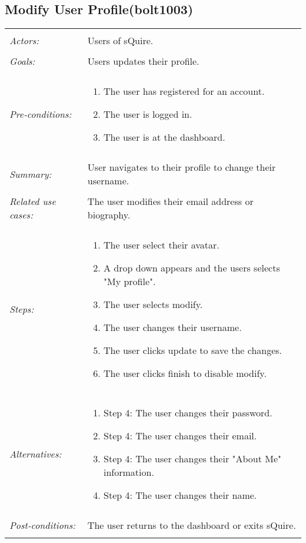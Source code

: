 \documentclass[11pt]{report}
\begin{document}
\subsection{Modify User Profile(bolt1003)}
\begin{tabular}{ p{2cm} p{12cm} }
 \hline
 \\
 \textit{Actors:} & Users of sQuire. \\ 
 \\
 \textit{Goals:} & Users updates their profile. \\
 \\
 \textit{Pre-conditions:} & \begin{enumerate}
  \item The user has registered for an account.
  \item The user is logged in.
  \item The user is at the dashboard.
 \end{enumerate} \\
 \\
 \textit{Summary:} & User navigates to their profile to change their username.\\ 
 \\
 \textit{Related use cases:} & The user modifies their email address or biography. \\ 
 \\
 \textit{Steps:} & \begin{enumerate}
  \item The user select their avatar.
  \item A drop down appears and the users selects "My profile".
  \item The user selects modify. 
  \item The user changes their username.
  \item The user clicks update to save the changes.
  \item The user clicks finish to disable modify.
 \end{enumerate} \\
 \\
 \textit{Alternatives:} & \begin{enumerate} 
  \item Step 4: The user changes their password.
  \item Step 4: The user changes their email.
  \item Step 4: The user changes their "About Me" information.
  \item Step 4: The user changes their name.
 \end{enumerate} \\
 \\
 \textit{Post-conditions:} & The user returns to the dashboard or exits sQuire. \\
 \\
\hline
\end{tabular}
\end{document}
